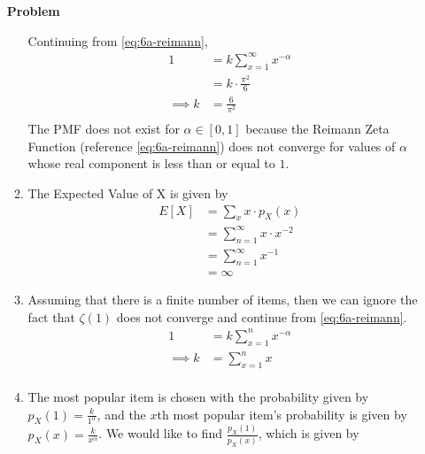 \documentclass[12pt]{article}
\newenvironment{Ex}{\textbf{Problem}\vspace{.75em}\\}{}
\begin{document}
\begin{enumerate}
\begin{Ex}
\begin{solution}
\begin{enumerate}
\begin{equation}
          \end{equation}
          Continuing from \cref{eq:6a-reimann},
          \begin{equation}
            \label{eq:6a-sol}
            \begin{aligned}
              1 &= k \sum_{x=1}^\infty x^{-\alpha} \\
              &= k \cdot \frac{\pi^2}{6} \\
              \implies k &= \frac{6}{\pi^2} \\
            \end{aligned}
          \end{equation}
          The PMF does not exist for $\alpha \in [0,1]$ because the
          Reimann Zeta Function (reference \cref{eq:6a-reimann}) does
          not converge for values of $\alpha$ whose real component is
          less than or equal to $1$.
        \item The Expected Value of X is given by
          \begin{equation}
            \label{eq:6b-sol}
            \begin{aligned}
              E[X] &= \sum_x x \cdot p_X(x) \\
              &= \sum_{n=1}^\infty x \cdot x^{-2} \\
              &= \sum_{n=1}^\infty x^{-1} \\
              &= \infty
            \end{aligned}
          \end{equation}
        \item Assuming that there is a finite number of items, then we
          can ignore the fact that $\zeta(1)$ does not converge and
          continue from \cref{eq:6a-reimann}.
          \begin{equation}
            \label{eq:6c-sol}
            \begin{aligned}
              1 &= k \sum_{x=1}^n x^{-\alpha} \\
              \implies k &= \sum_{x=1}^n x \\
            \end{aligned}
          \end{equation}
        \item The most popular item is chosen with the probability given
          by $p_X(1) = \frac{k}{1^{\alpha}}$, and the $x$th most
          popular item's probability is given by
          $p_X(x) = \frac{k}{x^{\alpha}}$. We would like to find
          $\frac{p_X(1)}{p_X(x)}$, which is given by

\end{enumerate}
\end{solution}
\end{Ex}
\end{enumerate}
\end{document}
